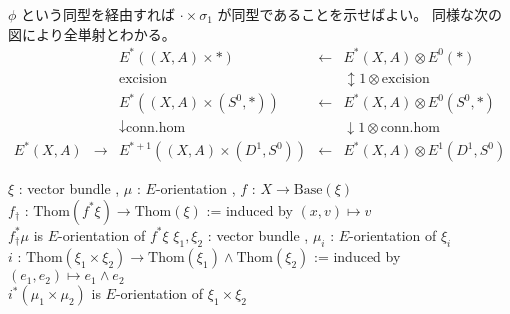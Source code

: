 \documentclass[dvipdfmx]{jsarticle}
\begin{document}
\begin{Proof}
\itemprof
  \(\phi\) という同型を経由すれば \(\cdot \times \sigma_{1}\) が同型であることを示せばよい。
  同様な次の図により全単射とわかる。
  \[\begin{matrix}
    & & E^{*}((X, A) \times *) & \leftarrow & E^{*}(X, A) \otimes E^{0}(*) \\
    & & \text{excision} & & \updownarrow 1 \otimes \text{excision} \\
    & & E^{*}((X, A) \times (S^{0}, *)) & \leftarrow & E^{*}(X, A) \otimes E^{0}(S^0, *) \\
    & & \downarrow \text{conn.hom} & & \downarrow 1 \otimes \text{conn.hom} \\
    E^{*}(X, A) & \to & E^{*+1}((X, A) \times (D^{1}, S^{0})) & \leftarrow & E^{*}(X, A) \otimes E^{1}(D^{1}, S^{0})
  \end{matrix}\]
\end{Proof}

\begin{Theorem}
\itemprop
  \For \(\xi\) : vector bundle , \(\mu\) : \(E\)-orientation , \(f\) : \(X \to \text{Base}(\xi)\)  \\
  \Let \(f_\dagger\) : \(\text{Thom}(f^* \xi) \to \text{Thom}(\xi)\) := induced by \((x,v) \mapsto v\) \\
  \Then \(f_\dagger^* \mu\) is \(E\)-orientation of \(f^*\xi\)
\itemprop
  \For \(\xi_1 , \xi_2\) : vector bundle , \(\mu_i\) : \(E\)-orientation of \(\xi_i\) \\
  \Let \(i\) : \(\text{Thom}(\xi_1 \times \xi_2) \to \text{Thom}(\xi_1) \wedge \text{Thom}(\xi_2)\) := induced by \((e_1,e_2) \mapsto e_1 \wedge e_2\) \\
  \Then \(i^*(\mu_1 \times \mu_2)\) is \(E\)-orientation of \(\xi_1 \times \xi_2\)
\end{Theorem}
\end{document}
